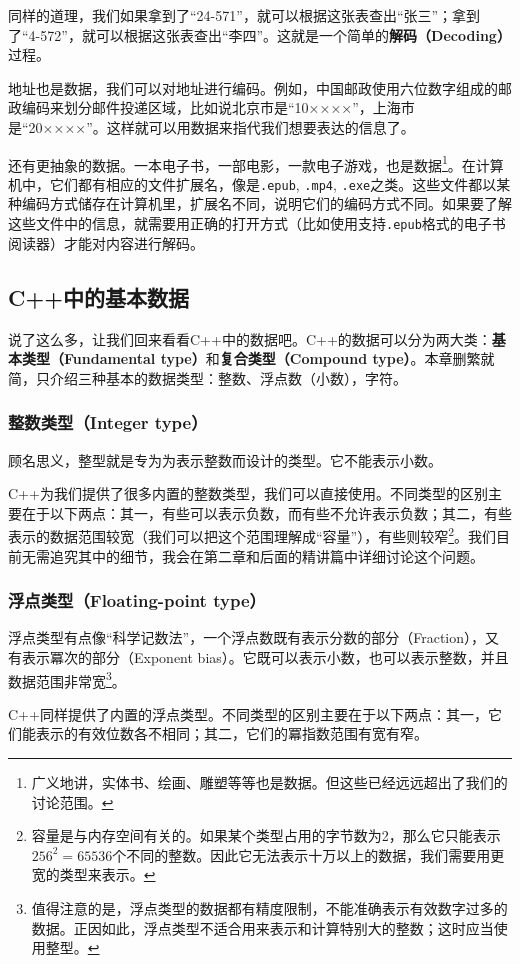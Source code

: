 同样的道理，我们如果拿到了``24-571''，就可以根据这张表查出``张三''；拿到了``4-572''，就可以根据这张表查出``李四''。这就是一个简单的\textbf{解码（Decoding）}过程。\par
地址也是数据，我们可以对地址进行编码。例如，中国邮政使用六位数字组成的邮政编码来划分邮件投递区域，比如说北京市是``10××××''，上海市是``20××××''。这样就可以用数据来指代我们想要表达的信息了。\par
还有更抽象的数据。一本电子书，一部电影，一款电子游戏，也是数据\footnote{广义地讲，实体书、绘画、雕塑等等也是数据。但这些已经远远超出了我们的讨论范围。}。在计算机中，它们都有相应的文件扩展名，像是\texttt{.epub}, \texttt{.mp4}, \texttt{.exe}之类。这些文件都以某种编码方式储存在计算机里，扩展名不同，说明它们的编码方式不同。如果要了解这些文件中的信息，就需要用正确的打开方式（比如使用支持\texttt{.epub}格式的电子书阅读器）才能对内容进行解码。\par
\subsection*{C++中的基本数据}
说了这么多，让我们回来看看C++中的数据吧。C++的数据可以分为两大类：\textbf{基本类型（Fundamental type）}和\textbf{复合类型（Compound type）}。本章删繁就简，只介绍三种基本的数据类型：整数、浮点数（小数），字符。\par
\subsubsection*{整数类型（Integer type）}
顾名思义，整型就是专为为表示整数而设计的类型。它不能表示小数。\par
C++为我们提供了很多内置的整数类型，我们可以直接使用。不同类型的区别主要在于以下两点：其一，有些可以表示负数，而有些不允许表示负数；其二，有些表示的数据范围较宽（我们可以把这个范围理解成``容量''），有些则较窄\footnote{容量是与内存空间有关的。如果某个类型占用的字节数为2，那么它只能表示$256^2=65536$个不同的整数。因此它无法表示十万以上的数据，我们需要用更宽的类型来表示。}。我们目前无需追究其中的细节，我会在第二章和后面的精讲篇中详细讨论这个问题。\par
\subsubsection*{浮点类型（Floating-point type）}
浮点类型有点像``科学记数法''，一个浮点数既有表示分数的部分（Fraction），又有表示冪次的部分（Exponent bias）。它既可以表示小数，也可以表示整数，并且数据范围非常宽\footnote{值得注意的是，浮点类型的数据都有精度限制，不能准确表示有效数字过多的数据。正因如此，浮点类型不适合用来表示和计算特别大的整数；这时应当使用整型。}。\par
C++同样提供了内置的浮点类型。不同类型的区别主要在于以下两点：其一，它们能表示的有效位数各不相同；其二，它们的冪指数范围有宽有窄。\par
